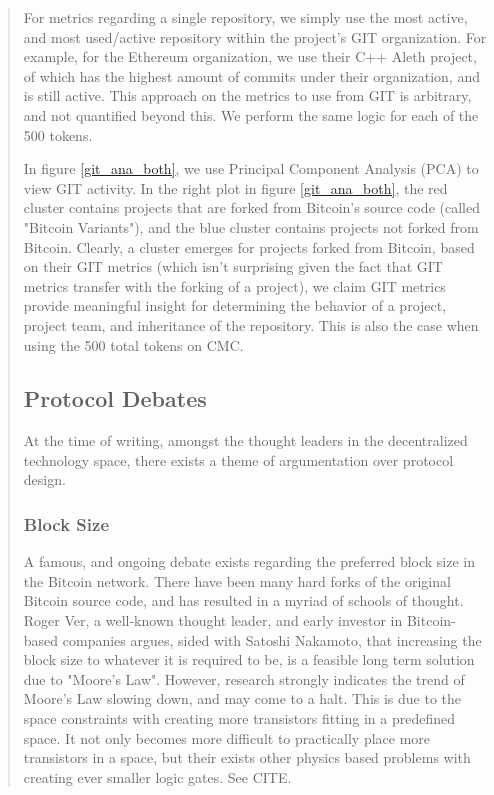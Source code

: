 \documentclass[12pt, titlepage, twocolumn]{report}
\begin{document}
\begin{quotation}
For metrics regarding a single repository, we simply use the most active, and most used/active repository within the project's GIT organization. For example, for the Ethereum organization, we use their C++ Aleth project, of which has the highest amount of commits under their organization, and is still active. This approach on the metrics to use from GIT is arbitrary, and not quantified beyond this. We perform the same logic for each of the 500 tokens. 

In figure \ref{git_ana_both}, we use Principal Component Analysis (PCA) to view GIT activity. In the right plot in figure \ref{git_ana_both}, the red cluster contains projects that are forked from Bitcoin's source code (called "Bitcoin Variants"), and the blue cluster contains projects not forked from Bitcoin. Clearly, a cluster emerges for projects forked from Bitcoin, based on their GIT metrics (which isn't surprising given the fact that GIT metrics transfer with the forking of a project), we claim GIT metrics provide meaningful insight for determining the behavior of a project, project team, and inheritance of the repository. This is also the case when using the 500 total tokens on CMC.

\subsection{Protocol Debates}
At the time of writing, amongst the thought leaders in the decentralized technology space, there exists a theme of argumentation over protocol design. 

\subsubsection{Block Size}
A famous, and ongoing debate exists regarding the preferred block size in the Bitcoin network. There have been many hard forks of the original Bitcoin source code, and has resulted in a myriad of schools of thought. Roger Ver, a well-known thought leader, and early investor in Bitcoin-based companies argues, sided with Satoshi Nakamoto, that increasing the block size to whatever it is required to be, is a feasible long term solution due to "Moore's Law". However, research strongly indicates the trend of Moore's Law slowing down, and may come to a halt. This is due to the space constraints with creating more transistors fitting in a predefined space. It not only becomes more difficult to practically place more transistors in a space, but their exists other physics based problems with creating ever smaller logic gates. See CITE. 


\end{quotation}
\end{document}
